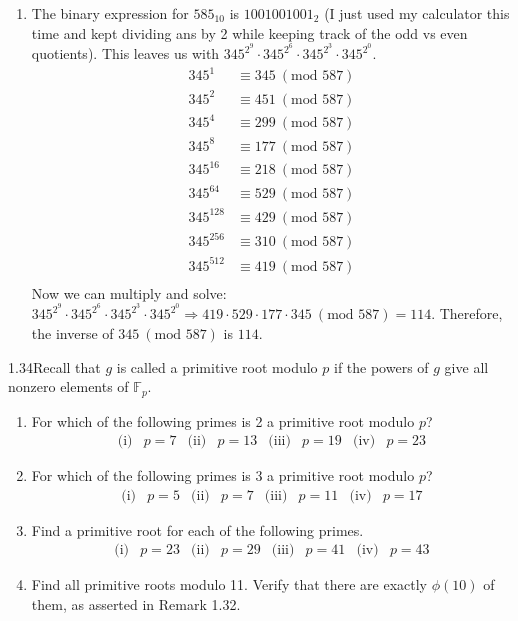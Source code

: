 {\begin{enumerate}
\begin{enumerate}[label=(\roman*)]
        \item The binary expression for $585_{10}$ is $1001001001_2$ (I just used my calculator this time and kept dividing ans by 2 while keeping track of the odd vs even quotients). This leaves us with $345^{2^9} \cdot 345^{2^6} \cdot 345^{2^3} \cdot 345^{2^0}$.
        \begin{align*}            
            345^1 &\equiv 345 \ (\text{mod } 587) \\
            345^2 &\equiv 451 \ (\text{mod } 587) \\
            345^4 &\equiv 299 \ (\text{mod } 587) \\
            345^8 &\equiv 177 \ (\text{mod } 587) \\
            345^{16} &\equiv 218 \ (\text{mod } 587) \\
            345^{64} &\equiv 529 \ (\text{mod } 587) \\
            345^{128} &\equiv 429 \ (\text{mod } 587) \\
            345^{256} &\equiv 310 \ (\text{mod } 587) \\
            345^{512} &\equiv 419 \ (\text{mod } 587) \\
        \end{align*}
        Now we can multiply and solve: $345^{2^9} \cdot 345^{2^6} \cdot 345^{2^3} \cdot 345^{2^0} \Rightarrow 419 \cdot 529 \cdot 177 \cdot 345 \ (\text{mod } 587) = 114$. Therefore, the inverse of $345 \ (\text{mod } 587)$ is $114$.
    \end{enumerate}
\end{enumerate}
}

\begin{exercise}
    {1.34}Recall that \( g \) is called a primitive root modulo \( p \) if the powers of \( g \) give all nonzero elements of \( \mathbb{F}_p \).
\begin{enumerate}[label=(\alph*)]
    \item For which of the following primes is 2 a primitive root modulo \( p \)?
    \[
    \begin{array}{llllllll}
    \text{(i)}&p = 7 & \text{(ii)}&p = 13 & \text{(iii)}&p = 19 & \text{(iv)}&p = 23
    \end{array}
    \]
    \item For which of the following primes is 3 a primitive root modulo \( p \)?
    \[
    \begin{array}{llllllll}
    \text{(i)}&p = 5 & \text{(ii)}&p = 7 & \text{(iii)}&p = 11 & \text{(iv)}&p = 17
    \end{array}
    \]
    \item Find a primitive root for each of the following primes.
    \[
    \begin{array}{llllllll}
         \text{(i)}&p = 23 & \text{(ii)}&p = 29 & \text{(iii)}&p = 41 & \text{(iv)}&p = 43  
    \end{array}
    \]
    \item Find all primitive roots modulo 11. Verify that there are exactly $\phi(10)$ of them, as asserted in Remark 1.32.
\end{enumerate}
\end{exercise}

